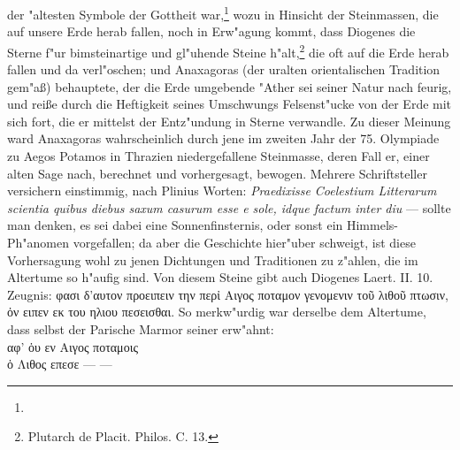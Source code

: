 \documentclass[a4paper, 11pt, oneside, polutonikogreek, german]{article}
\begin{document}
der "altesten Symbole der Gottheit war,\footnote{} wozu in Hinsicht der Steinmassen, die auf unsere Erde herab fallen, noch in Erw"agung kommt, dass Diogenes die Sterne f"ur bimsteinartige und gl"uhende Steine h"alt,\footnote{Plutarch de Placit. Philos. C. 13.} die oft auf die Erde herab fallen und da verl"oschen; und Anaxagoras (der uralten orientalischen Tradition gem"aß) behauptete, der die Erde umgebende "Ather sei seiner Natur nach feurig, und reiße durch die Heftigkeit seines Umschwungs Felsenst"ucke von der Erde mit sich fort, die er mittelst der Entz"undung in Sterne verwandle. Zu dieser Meinung ward Anaxagoras wahrscheinlich durch jene im zweiten Jahr der 75. Olympiade zu Aegos Potamos in Thrazien niedergefallene Steinmasse, deren Fall er, einer alten Sage nach, berechnet und vorhergesagt, bewogen. Mehrere Schriftsteller versichern einstimmig, nach Plinius Worten: \emph{Praedixisse Coelestium Litterarum scientia quibus diebus saxum casurum esse e sole, idque factum inter diu} --- sollte man denken, es sei dabei eine Sonnenfinsternis, oder sonst ein Himmels-Ph"anomen vorgefallen; da aber die Geschichte hier"uber schweigt, ist diese Vorhersagung wohl zu jenen Dichtungen und Traditionen zu z"ahlen, die im Altertume so h"aufig sind. Von diesem Steine gibt auch Diogenes Laert. II. 10. Zeugnis: φασι δ'αυτον προειπειν την περἰ Αιγος ποταμον γενομενιν τοῦ λιθοῦ πτωσιν, ὀν ειπεν εκ του ηλιου πεσεισθαι. So merkw"urdig war derselbe dem Altertume, dass selbst der Parische Marmor seiner erw"ahnt:
\vspace{1pt}
\\
αφ' ὁυ εν Αιγος ποταμοις\\
ὁ Λιθος επεσε --- ---\\
\vspace{1pt}
\end{document}
